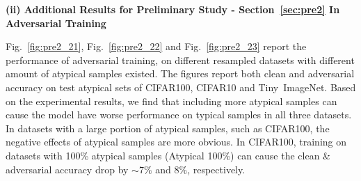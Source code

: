 \textbf{(ii) Additional Results for Preliminary Study - Section~\ref{sec:pre2} In Adversarial Training}

Fig.~\ref{fig:pre2_21}, Fig.~\ref{fig:pre2_22} and Fig.~\ref{fig:pre2_23} report the performance of adversarial training, on different resampled datasets with different amount of atypical samples existed. The figures report both clean and adversarial accuracy on test atypical sets of CIFAR100, CIFAR10 and Tiny~ImageNet. Based on the experimental results, we find that including more atypical samples can cause the model have worse performance on typical samples in all three datasets. In datasets with a large portion of atypical samples, such as CIFAR100, the negative effects of atypical samples are more obvious. In CIFAR100, training on datasets with 100\% atypical samples (Atypical 100\%) can cause the clean \& adversarial accuracy drop by $\sim7\%$ and $8\%$, respectively.

